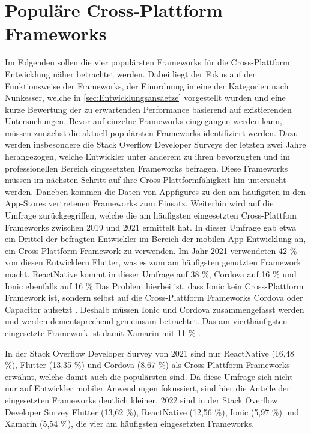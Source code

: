 \chapter{Populäre Cross-Plattform Frameworks}
\label{ch:Frameworks}

Im Folgenden sollen die vier populärsten Frameworks für die Cross-Plattform Entwicklung näher betrachtet werden.
Dabei liegt der Fokus auf der Funktionsweise der Frameworks, der Einordnung in eine der Kategorien nach Nunkesser, welche in \autoref{sec:Entwicklungsansaetze} vorgestellt wurden und eine kurze Bewertung der zu erwartenden Performance basierend auf existierenden Untersuchungen.
Bevor auf einzelne Frameworks eingegangen werden kann, müssen zunächst die aktuell populärsten Frameworks identifiziert werden.
Dazu werden insbesondere die Stack Overflow Developer Surveys der letzten zwei Jahre \cite{Stackoverflow_2021} \cite{Stackoverflow_2022} herangezogen, welche Entwickler unter anderem zu ihren bevorzugten und im professionellen Bereich eingesetzten Frameworks befragen.
Diese Frameworks müssen im nächsten Schritt auf ihre Cross-Plattformfähigkeit hin untersucht werden.
Daneben kommen die Daten von Appfigures zu den am häufigsten in den App-Stores vertretenen Frameworks \cite{Appfigures_TopSDKs} zum Einsatz.
Weiterhin wird auf die Umfrage \cite{Statista_UsedCrossPlatformFrameworks} zurückgegriffen, welche die am häufigsten eingesetzten Cross-Plattfom Frameworks zwischen 2019 und 2021 ermittelt hat.
In dieser Umfrage gab etwa ein Drittel der befragten Entwickler im Bereich der mobilen App-Entwicklung an, ein Cross-Plattform Framework zu verwenden.
Im Jahr 2021 verwendeten 42 \% von diesen Entwicklern Flutter, was es zum am häufigsten genutzten Framework macht.
ReactNative kommt in dieser Umfrage auf 38 \%, Cordova auf 16 \% und Ionic ebenfalls auf 16 \%
Das Problem hierbei ist, dass Ionic kein Cross-Plattform Framework ist, sondern selbst auf die Cross-Plattform Frameworks Cordova oder Capacitor aufsetzt \cite{Ionic_Docs}.
Deshalb müssen Ionic und Cordova zusammengefasst werden und werden dementsprechend gemeinsam betrachtet.
Das am vierthäufigsten eingesetzte Framework ist damit Xamarin mit 11 \% \cite{Statista_UsedCrossPlatformFrameworks}.

In der Stack Overflow Developer Survey von 2021 \cite{Stackoverflow_2021} sind nur ReactNative (16,48 \%), Flutter (13,35 \%) und Cordova (8,67 \%) als Cross-Plattform Frameworks erwähnt, welche damit auch die populärsten sind.
Da diese Umfrage sich nicht nur auf Entwickler mobiler Anwendungen fokussiert, sind hier die Anteile der eingesetzten Frameworks deutlich kleiner.
2022 sind in der Stack Overflow Developer Survey \cite{Stackoverflow_2022} Flutter (13,62 \%), ReactNative (12,56 \%), Ionic (5,97 \%) und Xamarin (5,54 \%), die vier am häufigsten eingesetzten Frameworks.

